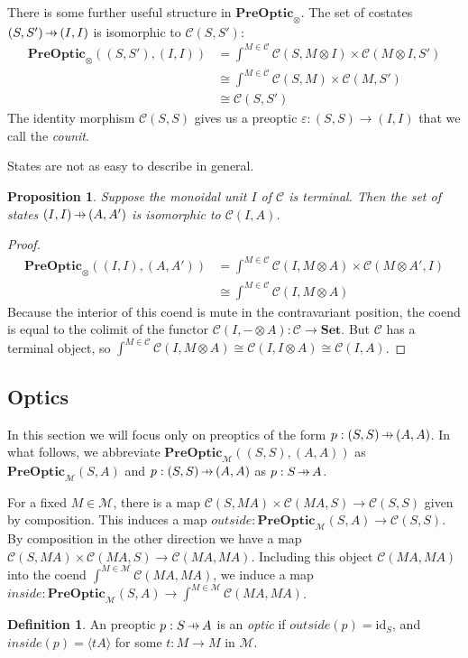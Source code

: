 \documentclass[11pt,a4paper]{article}
\theoremstyle{plain}
\newtheorem{proposition}[theorem]{Proposition}
\theoremstyle{definition}
\newtheorem{definition}[theorem]{Definition}
\newcommand{\C}{\mathscr{C}}
\newcommand{\M}{\mathscr{M}}
\newcommand{\Set}{\mathbf{Set}}
\newcommand{\PreOptic}{\mathbf{PreOptic}}
\newcommand{\id}{\mathrm{id}}
\newcommand{\hto}{\ensuremath{\,\mathaccent\shortmid\rightarrow\,}}
\begin{document}
There is some further useful structure in $\PreOptic_\otimes$. The set of costates $(S, S') \hto (I, I)$ is isomorphic to $\C(S, S')$:
\begin{align*}
\PreOptic_\otimes((S, S'), (I, I)) 
&= \int^{M \in \C} \C(S, M \otimes I) \times \C(M \otimes I, S') \\
&\cong \int^{M \in \C} \C(S, M) \times \C(M, S') \\
&\cong \C(S, S')
\end{align*}
The identity morphism $\C(S, S)$ gives us a preoptic $\varepsilon : (S, S) \to (I, I)$ that we call the \emph{counit}. 

States are not as easy to describe in general.

\begin{proposition}
Suppose the monoidal unit $I$ of $\C$ is terminal. Then the set of states $(I, I) \hto (A, A')$ is isomorphic to $\C(I, A)$.
\end{proposition}
\begin{proof}
\begin{align*}
\PreOptic_\otimes((I,I), (A,A')) 
&= \int^{M \in \C} \C(I, M \otimes A) \times \C(M \otimes A', I) \\
&\cong \int^{M \in \C} \C(I, M \otimes A)
\end{align*}
Because the interior of this coend is mute in the contravariant position, the coend is equal to the colimit of the functor $\C(I, - \otimes A) : \C \to \Set$. But $\C$ has a terminal object, so $\int^{M \in \C} \C(I, M \otimes A) \cong \C(I, I \otimes A) \cong \C(I, A)$.
\end{proof}

\subsection{Optics}
In this section we will focus only on preoptics of the form $p : (S,S) \hto (A, A)$. In what follows, we abbreviate $\PreOptic_\M((S, S), (A, A))$ as $\PreOptic_\M(S, A)$ and $p : (S, S) \hto (A, A)$ as $p : S \hto A$.

For a fixed $M \in \M$, there is a map $\C(S, M A) \times \C(M A, S) \to \C(S, S)$ given by composition. This induces a map $outside : \PreOptic_\M(S, A) \to \C(S, S)$. By composition in the other direction we have a map $\C(S, M A) \times \C(M A, S) \to \C(M A, M A)$. Including this object $\C(M A, M A)$ into the coend $\int^{M \in \M} \C(M A, M A)$, we induce a map $inside : \PreOptic_\M(S, A) \to \int^{M \in \M} \C(M A, M A)$. 
\begin{definition}
An preoptic $p : S \hto A$ is an \emph{optic} if $outside(p) = \id_S$, and $inside(p) = \langle t A \rangle$ for some $t : M \to M$ in $\M$.
\end{definition}
\end{document}
